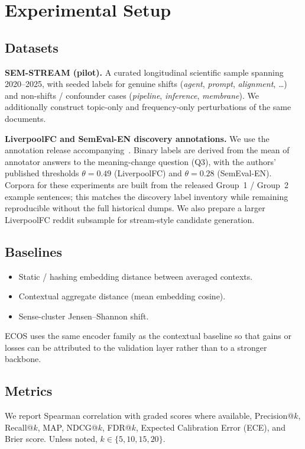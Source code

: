 \documentclass[journal]{IEEEtran}
\begin{document}
\section{Experimental Setup}
\label{sec:setup}

\subsection{Datasets}
\textbf{SEM-STREAM (pilot).}
A curated longitudinal scientific sample spanning 2020--2025, with seeded labels for genuine shifts (\textit{agent}, \textit{prompt}, \textit{alignment}, \ldots) and non-shifts / confounder cases (\textit{pipeline}, \textit{inference}, \textit{membrane}).
We additionally construct topic-only and frequency-only perturbations of the same documents.

\textbf{LiverpoolFC and SemEval-EN discovery annotations.}
We use the annotation release accompanying~\cite{umarova2025discovery}.
Binary labels are derived from the mean of annotator answers to the meaning-change question (Q3), with the authors' published thresholds $\theta=0.49$ (LiverpoolFC) and $\theta=0.28$ (SemEval-EN).
Corpora for these experiments are built from the released Group~1 / Group~2 example sentences; this matches the discovery label inventory while remaining reproducible without the full historical dumps.
We also prepare a larger LiverpoolFC reddit subsample for stream-style candidate generation.

\subsection{Baselines}
\begin{itemize}
\item Static / hashing embedding distance between averaged contexts.
\item Contextual aggregate distance (mean embedding cosine).
\item Sense-cluster Jensen--Shannon shift.
\end{itemize}
ECOS uses the same encoder family as the contextual baseline so that gains or losses can be attributed to the validation layer rather than to a stronger backbone.

\subsection{Metrics}
We report Spearman correlation with graded scores where available, Precision@$k$, Recall@$k$, MAP, NDCG@$k$, FDR@$k$, Expected Calibration Error (ECE), and Brier score.
Unless noted, $k\in\{5,10,15,20\}$.
\end{document}
